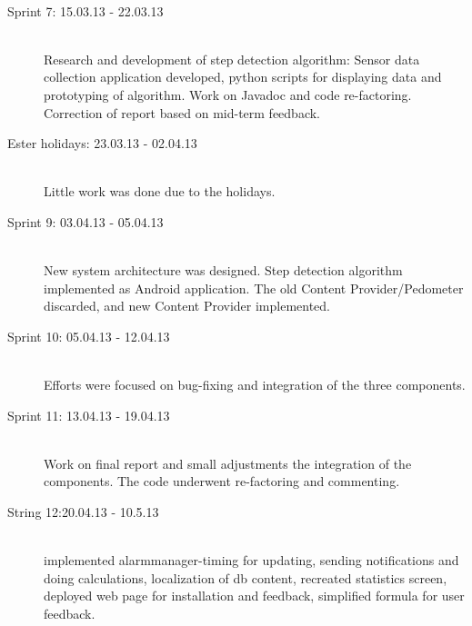 \begin{description}
 \\ \noindent\makebox[\linewidth]{\rule{\textwidth}{1pt}}
  \item[Sprint 7: 15.03.13 - 22.03.13]    \hfill \\
Research and development of step detection algorithm: Sensor data collection application developed, python scripts for displaying data and prototyping of algorithm. Work on Javadoc and code re-factoring. Correction of report based on mid-term feedback.
 \\ \noindent\makebox[\linewidth]{\rule{\textwidth}{1pt}}
  \item[Ester holidays: 23.03.13 - 02.04.13]    \hfill \\
Little work was done due to the holidays.
 \\ \noindent\makebox[\linewidth]{\rule{\textwidth}{1pt}} 
 \item[Sprint 9: 03.04.13 - 05.04.13]    \hfill \\
New system architecture was designed. Step detection algorithm implemented as Android application. The old Content Provider/Pedometer discarded, and new Content Provider implemented. 
 \\ \noindent\makebox[\linewidth]{\rule{\textwidth}{1pt}} 
 \item[Sprint 10: 05.04.13 - 12.04.13]    \hfill \\
Efforts were focused on bug-fixing and integration of the three components. 
 \\ \noindent\makebox[\linewidth]{\rule{\textwidth}{1pt}}
  \item[Sprint 11: 13.04.13 - 19.04.13]    \hfill \\
Work on final report and small adjustments the integration of the components. The code underwent re-factoring and commenting. 
 \\ \noindent\makebox[\linewidth]{\rule{\textwidth}{1pt}}
 \item[String 12:20.04.13 - 10.5.13] \hfill \\
  implemented alarmmanager-timing for updating, sending notifications and doing calculations, localization of db content, recreated statistics screen, deployed web page for installation and feedback, simplified formula for user feedback.
 \\ \noindent\makebox[\linewidth]{\rule{\textwidth}{1pt}}
\end{description}